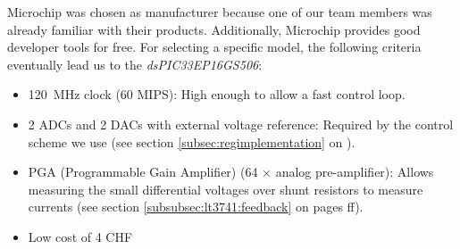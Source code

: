 Microchip  was chosen  as manufacturer  because one  of our  team members  was
already familiar  with their  products.  Additionally, Microchip  provides good
developer  tools  for free. For  selecting  a  specific model,  the  following
criteria eventually lead us to the \emph{dsPIC33EP16GS506}:

\begin{itemize}
    \item
        \SI{120}{\mega\hertz}  clock (60  MIPS): High enough  to allow  a fast
        control loop.
    \item
        2 ADCs  and 2  DACs with external  voltage reference: Required  by the
        control scheme  we use (see section  \ref{subsec:regimplementation} on
        \pageref{subsec:regimplementation}).
    \item
        PGA    (Programmable    Gain    Amplifier)   (64    $\times$    analog
        pre-amplifier): Allows     measuring     the    small     differential
        voltages     over    shunt     resistors    to     measure    currents
        (see     section      \ref{subsubsec:lt3741:feedback}     on     pages
        \pageref{subsubsec:lt3741:feedback}ff).
    \item
        Low cost of 4 CHF
\end{itemize}
